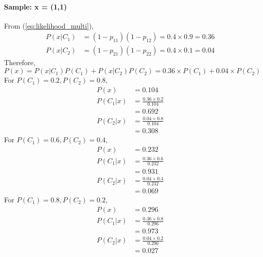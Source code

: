 \paragraph{Sample: x = (1,1)}
From (\ref{eq:likelihood_multi}),
\begin{equation*}
	\begin{split}
		P(x|C_1) &= (1-p_{11})(1-p_{12}) = 0.4 \times 0.9 = 0.36\\
		P(x|C_2) &= (1-p_{21})(1-p_{22}) = 0.4 \times 0.1 = 0.04
	\end{split}
\end{equation*}
Therefore,
\begin{equation*}\label{eq:evidence_multi}
	P(x) = P(x|C_1)P(C_1) + P(x|C_2)P(C_2) = 0.36\times P(C_1) + 0.04 \times P(C_2)
\end{equation*}
For $P(C_1) = 0.2, P(C_2) = 0.8$,
\begin{equation*}
	\begin{split}
		P(x) &= 0.104\\
		P(C_1|x) &= \frac{0.36\times 0.2}{0.104}\\
		&= 0.692\\
		P(C_2|x) &= \frac{0.04 \times 0.8}{0.104}\\
		&= 0.308
	\end{split}
\end{equation*}
For $P(C_1) = 0.6, P(C_2) = 0.4$,
\begin{equation*}
	\begin{split}
		P(x) &= 0.232\\
		P(C_1|x) &= \frac{0.36\times 0.6}{0.232}\\
		&= 0.931\\
		P(C_2|x) &= \frac{0.04 \times 0.4}{0.232}\\
		&= 0.069
	\end{split}
\end{equation*}
For $P(C_1) = 0.8, P(C_2) = 0.2$,
\begin{equation*}
	\begin{split}
		P(x) &= 0.296\\
		P(C_1|x) &= \frac{0.36\times 0.8}{0.296}\\
		&= 0.973\\
		P(C_2|x) &= \frac{0.04 \times 0.2}{0.296}\\
		&= 0.027
	\end{split}
\end{equation*}
